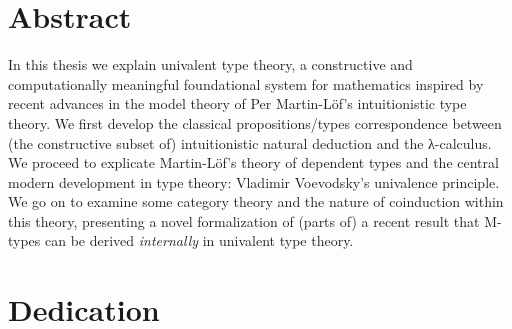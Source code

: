 \documentclass[12pt,twoside]{reedthesis}
\begin{document}

\tableofcontents

\chapter*{Abstract}

In this thesis we explain univalent type theory, a constructive and
computationally meaningful foundational system for mathematics inspired by
recent advances in the model theory of Per Martin-L\"of's intuitionistic type
theory. We first develop the classical propositions/types correspondence between
(the constructive subset of) intuitionistic natural deduction and the
λ-calculus. We proceed to explicate Martin-L\"of's theory of dependent types and
the central modern development in type theory: Vladimir Voevodsky's univalence
principle. We go on to examine some category theory and the nature of coinduction
within this theory, presenting a novel formalization of (parts of) a recent
result that M-types can be derived \textit{internally} in univalent type theory.

\chapter*{Dedication}

\mainmatter %
\pagestyle{fancyplain} %
\end{document}
